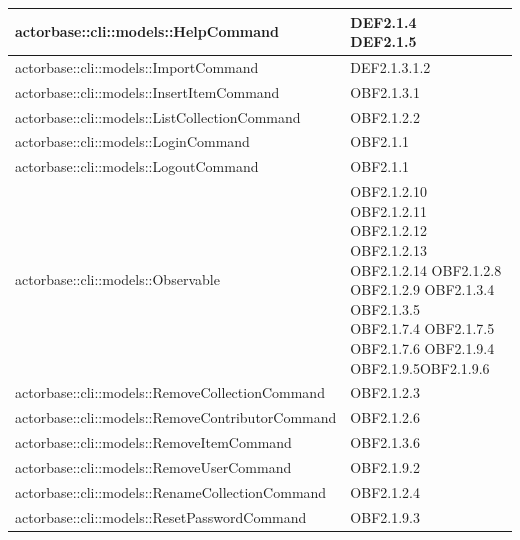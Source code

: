 \documentclass{scalatekids-article}
\begin{document}
\begin{longtable}[H]{|p{12cm}|p{5.5cm}|}
\hline
actorbase::cli::models::HelpCommand & \multiLineCell[t]{DEF2.1.4\\DEF2.1.5\\}\\
\hline
actorbase::cli::models::ImportCommand & \multiLineCell[t]{DEF2.1.3.1.2\\}\\
\hline
actorbase::cli::models::InsertItemCommand & \multiLineCell[t]{OBF2.1.3.1\\}\\
\hline
actorbase::cli::models::ListCollectionCommand & \multiLineCell[t]{OBF2.1.2.2\\}\\
\hline
actorbase::cli::models::LoginCommand & \multiLineCell[t]{OBF2.1.1\\}\\
\hline
actorbase::cli::models::LogoutCommand & \multiLineCell[t]{OBF2.1.1\\}\\
\hline
actorbase::cli::models::Observable & \multiLineCell[t]{OBF2.1.2.10 OBF2.1.2.11\\OBF2.1.2.12 OBF2.1.2.13\\OBF2.1.2.14 OBF2.1.2.8\\OBF2.1.2.9 OBF2.1.3.4\\OBF2.1.3.5\\OBF2.1.7.4 OBF2.1.7.5\\OBF2.1.7.6 OBF2.1.9.4\\OBF2.1.9.5OBF2.1.9.6\\}\\
\hline
actorbase::cli::models::RemoveCollectionCommand & \multiLineCell[t]{OBF2.1.2.3\\}\\
\hline
actorbase::cli::models::RemoveContributorCommand & \multiLineCell[t]{OBF2.1.2.6\\}\\
\hline
actorbase::cli::models::RemoveItemCommand & \multiLineCell[t]{OBF2.1.3.6\\}\\
\hline
actorbase::cli::models::RemoveUserCommand & \multiLineCell[t]{OBF2.1.9.2\\}\\
\hline
actorbase::cli::models::RenameCollectionCommand & \multiLineCell[t]{OBF2.1.2.4\\}\\
\hline
actorbase::cli::models::ResetPasswordCommand & \multiLineCell[t]{OBF2.1.9.3\\}\\

\end{longtable}
\end{document}
